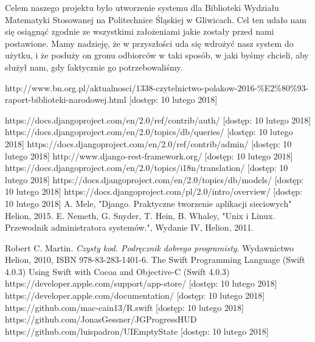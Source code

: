 \documentclass[twoside]{projektInzynierskiMS}
\begin{document}
Celem naszego projektu było utworzenie systemu dla Biblioteki Wydziału Matematyki Stosowanej na Politechnice Śląskiej w Gliwicach. Cel ten udało nam się osiągnąć zgodnie ze wszystkimi założeniami jakie zostały przed nami postawione. Mamy nadzieję, że w przyszłości uda się wdrożyć nasz system do użytku, i że posłuży on gronu odbiorców w taki sposób, w jaki byśmy chcieli, aby służył nam, gdy faktycznie go potrzebowaliśmy.


\begin{thebibliography}{12}

 http://www.bn.org.pl/aktualnosci/1338-czytelnictwo-polakow-2016-\%E2\%80\%93-raport-biblioteki-narodowej.html [dostęp: 10 lutego 2018]

 https://docs.djangoproject.com/en/2.0/ref/contrib/auth/ [dostęp: 10 lutego 2018]
 https://docs.djangoproject.com/en/2.0/topics/db/queries/ [dostęp: 10 lutego 2018]
 https://docs.djangoproject.com/en/2.0/ref/contrib/admin/ [dostęp: 10 lutego 2018]
 http://www.django-rest-framework.org/  [dostęp: 10 lutego 2018]
 https://docs.djangoproject.com/en/2.0/topics/i18n/translation/ [dostęp: 10 lutego 2018]
 https://docs.djangoproject.com/en/2.0/topics/db/models/ [dostęp: 10 lutego 2018]
 https://docs.djangoproject.com/pl/2.0/intro/overview/ [dostęp: 10 lutego 2018]
 A. Mele, "Django. Praktyczne tworzenie aplikacji sieciowych" Helion, 2015.
 E. Nemeth, G. Snyder, T. Hein, B. Whaley, "Unix i Linux. Przewodnik
administratora systemów.", Wydanie IV, Helion, 2011.


Robert C. Martin. 
\textit{Czysty kod. Podręcznik dobrego programisty}. 
Wydawnictwo Helion, 2010, ISBN 978-83-283-1401-6.
 The Swift Programming Language (Swift 4.0.3)
 Using Swift with Cocoa and Objective-C (Swift 4.0.3)
 https://developer.apple.com/support/app-store/ [dostęp: 10 lutego 2018]
 https://developer.apple.com/documentation/ [dostęp: 10 lutego 2018]
 https://github.com/mac-cain13/R.swift [dostęp: 10 lutego 2018]
 https://github.com/JonasGessner/JGProgressHUD
 https://github.com/luispadron/UIEmptyState [dostęp: 10 lutego 2018]


\end{thebibliography}
\end{document}
